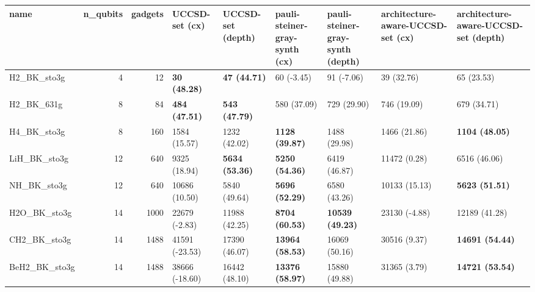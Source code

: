 \begin{tabular}{lrrllllll}
\toprule
name & n\_qubits & gadgets & UCCSD-set (cx) & UCCSD-set (depth) & pauli-steiner-gray-synth (cx) & pauli-steiner-gray-synth (depth) & architecture-aware-UCCSD-set (cx) & architecture-aware-UCCSD-set (depth) \\
\midrule
H2\_BK\_sto3g & 4 & 12 & \textbf{30 (48.28)} & \textbf{47 (44.71)} & 60 (-3.45) & 91 (-7.06) & 39 (32.76) & 65 (23.53) \\
H2\_BK\_631g & 8 & 84 & \textbf{484 (47.51)} & \textbf{543 (47.79)} & 580 (37.09) & 729 (29.90) & 746 (19.09) & 679 (34.71) \\
H4\_BK\_sto3g & 8 & 160 & 1584 (15.57) & 1232 (42.02) & \textbf{1128 (39.87)} & 1488 (29.98) & 1466 (21.86) & \textbf{1104 (48.05)} \\
LiH\_BK\_sto3g & 12 & 640 & 9325 (18.94) & \textbf{5634 (53.36)} & \textbf{5250 (54.36)} & 6419 (46.87) & 11472 (0.28) & 6516 (46.06) \\
NH\_BK\_sto3g & 12 & 640 & 10686 (10.50) & 5840 (49.64) & \textbf{5696 (52.29)} & 6580 (43.26) & 10133 (15.13) & \textbf{5623 (51.51)} \\
H2O\_BK\_sto3g & 14 & 1000 & 22679 (-2.83) & 11988 (42.25) & \textbf{8704 (60.53)} & \textbf{10539 (49.23)} & 23130 (-4.88) & 12189 (41.28) \\
CH2\_BK\_sto3g & 14 & 1488 & 41591 (-23.53) & 17390 (46.07) & \textbf{13964 (58.53)} & 16069 (50.16) & 30516 (9.37) & \textbf{14691 (54.44)} \\
BeH2\_BK\_sto3g & 14 & 1488 & 38666 (-18.60) & 16442 (48.10) & \textbf{13376 (58.97)} & 15880 (49.88) & 31365 (3.79) & \textbf{14721 (53.54)} \\
\bottomrule
\end{tabular}
